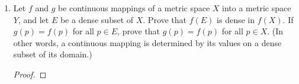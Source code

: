 \documentclass[../psets.tex]{subfiles}
\begin{document}
\begin{enumerate}[label={\textbf{\arabic*.}}]
\begin{proof}
        By definition, $Z(f)=f^{-1}(\{0\})$. Thus, since $\{0\}$ is closed as a finite set and $f$ is continuous, the Corollary to Theorem 4.8 implies that $Z(f)$ is closed.
    \end{proof}
    \item Let $f$ and $g$ be continuous mappings of a metric space $X$ into a metric space $Y$, and let $E$ be a dense subset of $X$. Prove that $f(E)$ is dense in $f(X)$. If $g(p)=f(p)$ for all $p\in E$, prove that $g(p)=f(p)$ for all $p\in X$. (In other words, a continuous mapping is determined by its values on a dense subset of its domain.)
    \begin{proof}



\end{proof}
\end{enumerate}
\end{document}
